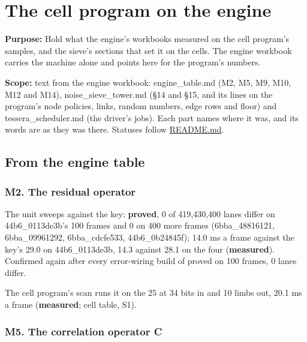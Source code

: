 \chapter{\texorpdfstring{The cell program on the engine}{The cell program on the engine}}
\label{chap:on-the-engine}

\textbf{Purpose:} Hold what the engine's workbooks measured on the cell program's samples, and the sieve's sections that set it on the cells. The engine workbook carries the machine alone and points here for the program's numbers.

\textbf{Scope:} text from the engine workbook: engine\_\allowbreak{}table.md (M2, M5, M9, M10, M12 and M14), noise\_\allowbreak{}sieve\_\allowbreak{}tower.md (§14 and §15, and its lines on the program's node policies, links, random numbers, edge rows and floor) and tessera\_\allowbreak{}scheduler.md (the driver's jobs). Each part names where it was, and its words are as they was there. Statuses follow \hyperref[chap:readme]{README.md}.

\section{\texorpdfstring{From the engine table}{From the engine table}}

\subsection{\texorpdfstring{M2. The residual operator}{M2. The residual operator}}

The unit sweeps against the key: \textbf{proved}, 0 of 419,430,400 lanes differ on 44b6\_\allowbreak{}0113de3b's 100 frames and 0 on 400 more frames (6bba\_\allowbreak{}48816121, 6bba\_\allowbreak{}09961292, 6bba\_\allowbreak{}cdcfe533, 44b6\_\allowbreak{}0b24845f); 14.0 ms a frame against the key's 29.0 on 44b6\_\allowbreak{}0113de3b, 14.3 against 28.1 on the four (\textbf{measured}). Confirmed again after every error-wiring build of proved on 100 frames, 0 lanes differ.

The cell program's scan runs it on the 25 at 34 bits in and 10 limbs out, 20.1 ms a frame (\textbf{measured}; cell table, S1).

\subsection{\texorpdfstring{M5. The correlation operator C}{M5. The correlation operator C}}

